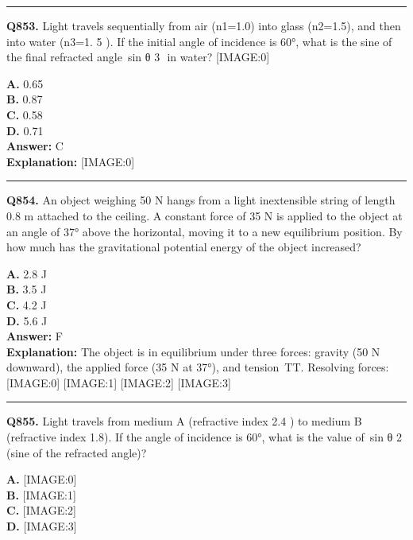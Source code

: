 \documentclass[12pt]{article}
\begin{document}
\hrule
\vspace{1em}


\noindent
\textbf{Q853.} Light travels sequentially from air (n1=1.0) into glass (n2=1.5), and then into water (n3=1.
5
). If the initial angle of incidence is 60°, what is the sine of the final refracted angle sin
θ
3
​
in water?
[IMAGE:0]



\textbf{A.} 0.65 \\
\textbf{B.} 0.87 \\
\textbf{C.} 0.58 \\
\textbf{D.} 0.71 \\

\textbf{Answer:} C \\
\textbf{Explanation:} [IMAGE:0]

\hrule
\vspace{1em}


\noindent
\textbf{Q854.} An object weighing 50 N hangs from a light inextensible string of length 0.8 m attached to the ceiling. A constant force of 35 N is applied to the object at an angle of 37° above the horizontal, moving it to a new equilibrium position. By how much has the gravitational potential energy of the object increased?



\textbf{A.} 2.8 J \\
\textbf{B.} 3.5 J \\
\textbf{C.} 4.2 J \\
\textbf{D.} 5.6 J \\

\textbf{Answer:} F \\
\textbf{Explanation:} The object is in equilibrium under three forces: gravity (50 N downward), the applied force (35 N at 37°), and tension TT. Resolving forces:
[IMAGE:0]
[IMAGE:1]
[IMAGE:2]
[IMAGE:3]

\hrule
\vspace{1em}


\noindent
\textbf{Q855.} Light travels from medium A (refractive index
2.4
) to medium B (refractive index 1.8). If the angle of incidence is 60°, what is the value of sin
θ
2
​
(sine of the refracted angle)?



\textbf{A.} [IMAGE:0] \\
\textbf{B.} [IMAGE:1] \\
\textbf{C.} [IMAGE:2] \\
\textbf{D.} [IMAGE:3] \\
\end{document}
